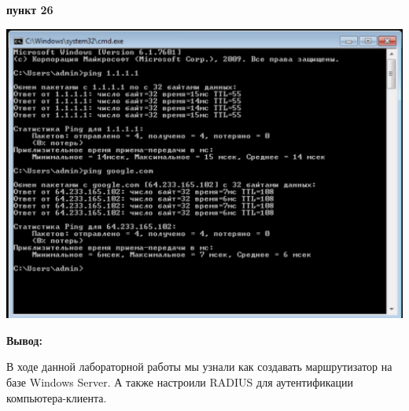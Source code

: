 \documentclass[a4paper,14pt]{extarticle}
\begin{document}
    \newpage
    \textbf{пункт 26}
    \begin{center}
        \includegraphics[scale=0.8]{26.png}
    \end{center}
    \textbf{Вывод:}

    В ходе данной лабораторной работы мы узнали как создавать маршрутизатор на базе Windows Server. А также настроили RADIUS для аутентификации компьютера-клиента.
\end{document}
